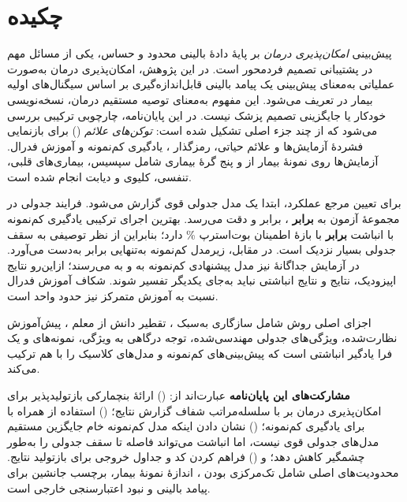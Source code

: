 \tableofcontents
\listoftables
\listoffigures

\chapter*{چکیده}
پیش‌بینی \emph{امکان‌پذیری درمان} بر پایۀ دادۀ بالینی محدود و حساس، یکی از مسائل مهم در پشتیبانی تصمیم فردمحور است. در این پژوهش، امکان‌پذیری درمان به‌صورت عملیاتی به‌معنای پیش‌بینی یک پیامد بالینی قابل‌اندازه‌گیری بر اساس سیگنال‌های اولیه بیمار در  تعریف می‌شود. این مفهوم به‌معنای توصیه مستقیم درمان، نسخه‌نویسی خودکار یا جایگزینی تصمیم پزشک نیست. در این پایان‌نامه، چارچوبی ترکیبی بررسی می‌شود که از چند جزء اصلی تشکیل شده است: \emph{توکن‌های علائم} () برای بازنمایی فشردۀ آزمایش‌ها و علائم حیاتی، رمزگذار ، یادگیری کم‌نمونه و آموزش فدرال. آزمایش‌ها روی نمونۀ  بیمار از  و پنج گرۀ بیماری شامل سپسیس، بیماری‌های قلبی، تنفسی، کلیوی و دیابت انجام شده است.

برای تعیین مرجع عملکرد، ابتدا یک مدل جدولی قوی گزارش می‌شود. فرایند  جدولی در مجموعۀ آزمون به \textbf{ برابر }،  برابر  و دقت  می‌رسد. بهترین اجرای ترکیبی یادگیری کم‌نمونه با انباشت \textbf{ برابر } با بازۀ اطمینان بوت‌استرپ \% \cnum{[0.699, 0.797]} دارد؛ بنابراین از نظر توصیفی به سقف جدولی بسیار نزدیک است. در مقابل، زیرمدل کم‌نمونه به‌تنهایی  برابر  به‌دست می‌آورد. در آزمایش جداگانۀ  نیز مدل پیشنهادی کم‌نمونه به \textbf{} و  به \textbf{} می‌رسند؛ ازاین‌رو نتایج اپیزودیک، نتایج  و نتایج انباشتی نباید به‌جای یکدیگر تفسیر شوند. شکاف آموزش فدرال نسبت به آموزش متمرکز نیز حدود \textbf{} واحد  است.

اجزای اصلی روش شامل سازگاری به‌سبک ، تقطیر دانش از معلم ، پیش‌آموزش  نظارت‌شده، ویژگی‌های جدولی مهندسی‌شده، توجه درگاهی به ویژگی، نمونه‌های  و یک فرا یادگیر انباشتی است که پیش‌بینی‌های کم‌نمونه و مدل‌های کلاسیک را با هم ترکیب می‌کند.

\textbf{مشارکت‌های این پایان‌نامه} عبارت‌اند از: () ارائۀ بنچمارکی بازتولیدپذیر برای امکان‌پذیری درمان بر  با سلسله‌مراتب شفاف گزارش نتایج؛ () استفاده از  همراه با  برای یادگیری کم‌نمونه؛ () نشان دادن اینکه مدل کم‌نمونه خام جایگزین مستقیم مدل‌های جدولی قوی نیست، اما انباشت می‌تواند فاصله تا سقف جدولی را به‌طور چشمگیر کاهش دهد؛ و () فراهم کردن کد و جداول خروجی برای بازتولید نتایج. محدودیت‌های اصلی شامل تک‌مرکزی بودن ، اندازۀ نمونۀ  بیمار، برچسب جانشین برای پیامد بالینی و نبود اعتبارسنجی خارجی است.

